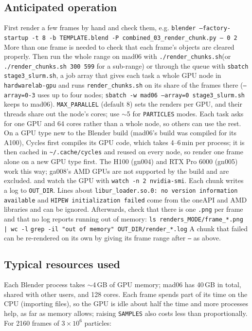 \documentclass[11pt]{article}
\newcommand{\pc}[1]{\texttt{#1}}
\begin{document}
\subsection{Anticipated operation}
First render a few frames by hand and check them, e.g.\newline
\pc{blender --factory-startup -t 8 -b TEMPLATE.blend -P combined\_03\_render\_chunk.py -- 0 2}\newline
More than one frame is needed to check that each frame's objects are cleared properly. Then run the whole range on mad06 with\newline
\pc{./render\_chunks.sh}\hfill(or \pc{./render\_chunks.sh 300 599} for a sub-range)\newline
or through the queue with \pc{sbatch stage3\_slurm.sh}, a job array that gives each task a whole GPU node in \pc{hardwarelab-gpu} and runs \pc{render\_chunks.sh} on its share of the frames there (\pc{--array=0-3} uses up to four nodes; \pc{sbatch -w mad06 --array=0 stage3\_slurm.sh} keeps to mad06). \pc{MAX\_PARALLEL} (default 8) sets the renders per GPU, and their threads share out the node's cores; use $\sim$5 for \pc{PARTICLES} modes. Each task asks for one GPU and 64 cores rather than a whole node, so others can use the rest. On a GPU type new to the Blender build (mad06's build was compiled for its A100), Cycles first compiles its GPU code, which takes 4--6\,min per process; it is then cached in \pc{\textasciitilde/.cache/cycles} and reused on every node, so render one frame alone on a new GPU type first. The H100 (gn004) and RTX Pro 6000 (gn005) work this way; ga008's AMD GPUs are not supported by the build and are excluded.\newline
and watch the GPU with \pc{watch -n 2 nvidia-smi}. Each chunk writes a log to \pc{OUT\_DIR}. Lines about \pc{libur\_loader.so.0: no version information available} and \pc{HIPEW initialization failed} come from the oneAPI and AMD libraries and can be ignored. Afterwards, check that there is one \pc{.png} per frame and that no log reports running out of memory:\newline
\pc{ls renders\_MODE/frame\_*.png | wc -l}\newline
\pc{grep -il "out of memory" OUT\_DIR/render\_*.log}\newline
A chunk that failed can be re-rendered on its own by giving its frame range after \pc{--} as above.
 
\subsection{Typical resources used}
Each Blender process takes $\sim$4\,GB of GPU memory; mad06 has 40\,GB in total, shared with other users, and 128 cores. Each frame spends part of its time on the CPU (importing files), so the GPU is idle about half the time and more processes help, as far as memory allows; raising \pc{SAMPLES} also costs less than proportionally. For 2160 frames of $3\times10^6$ particles:
 
\end{document}

